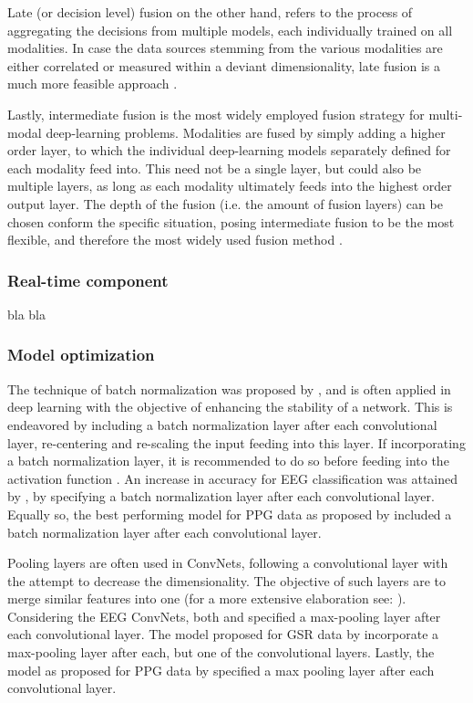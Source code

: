 \documentclass{article}
\begin{document}
Late (or decision level) fusion on the other hand, refers to the process of aggregating the decisions from multiple models, each individually trained on all modalities. In case the data sources stemming from the various modalities are either correlated or measured within a deviant dimensionality, late fusion is a much more feasible approach \cite{ramachandram2017deep}.

Lastly, intermediate fusion is the most widely employed fusion strategy for multi-modal deep-learning problems. Modalities are fused by simply adding a higher order layer, to which the individual deep-learning models separately defined for each modality feed into. This need not be a single layer, but could also be multiple layers, as long as each modality ultimately feeds into the highest order output layer. The depth of the fusion (i.e. the amount of fusion layers) can be chosen conform the specific situation, posing intermediate fusion to be the most flexible, and therefore the most widely used fusion method \cite{ramachandram2017deep}. 

\subsubsection{Real-time component}
bla bla 

\subsubsection{Model optimization}
The technique of batch normalization was proposed by  ,  and is often applied in deep learning with the objective of enhancing the stability of a network. This is endeavored by including a batch normalization layer after each convolutional layer, re-centering and re-scaling the input feeding into this layer. If incorporating a batch normalization layer, it is recommended to do so before feeding into the activation function \cite{ioffe2015batch}. An increase in accuracy for EEG classification was attained by ,   by specifying a batch normalization layer after each convolutional layer. Equally so, the best performing model for PPG data as proposed by  included a batch normalization layer after each convolutional layer.  

Pooling layers are often used in ConvNets, following a convolutional layer with the attempt to decrease the dimensionality. The objective of such layers are to merge similar features into one (for a more extensive elaboration see: \cite{lecun2015deep}). Considering the EEG ConvNets, both  and  specified a max-pooling layer after each convolutional layer. The model proposed for GSR data by  incorporate a max-pooling layer after each, but one of the convolutional layers. Lastly, the model as proposed for PPG data by \cite{biswas2019cornet}  specified a max pooling layer after each convolutional layer. 
\end{document}
